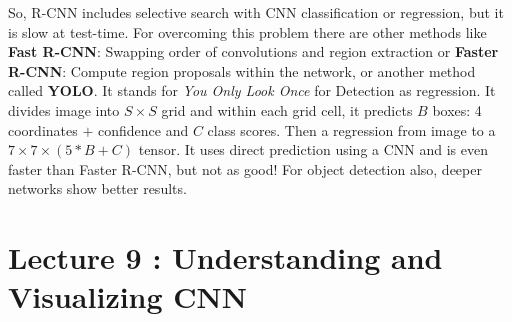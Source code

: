 \documentclass[12pt,a4paper]{article}
\begin{document}
So, R-CNN includes selective search with CNN classification or regression, but it is slow at test-time. For overcoming this problem there are other methods like \textbf{Fast R-CNN}: Swapping order of convolutions and region extraction or \textbf{Faster R-CNN}: Compute region proposals within the network, or another method called \textbf{YOLO}. It stands for \textit{You Only Look Once} for Detection as regression. It divides image into $S \times S$ grid and within each grid cell, it predicts $B$ boxes: 4 coordinates $+$ confidence and $C$ class scores. Then a regression from image to a $7 \times 7 \times (5*B + C)$ tensor. It uses direct prediction using a CNN and is even faster than Faster R-CNN, but not as good! For object detection also, deeper networks show better results.

\section{Lecture 9 : Understanding and Visualizing CNN}
\end{document}
